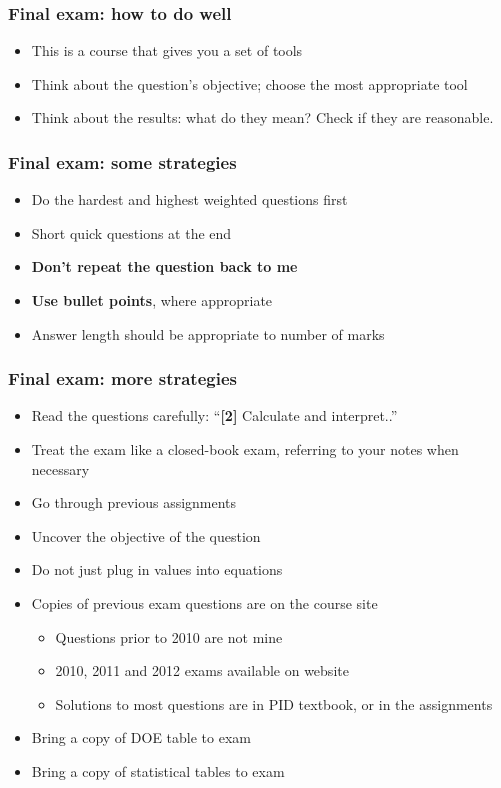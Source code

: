 \begin{frame}\frametitle{Final exam: how to do well}
	\begin{itemize}
		\item	This is a course that gives you a set of tools 
		\item	Think about the question's objective; choose the most appropriate tool 
		\item	Think about the results: what do they mean? Check if they are reasonable. 
	\end{itemize}
\end{frame}

\begin{frame}\frametitle{Final exam: some strategies}
	\begin{itemize}
		\item	Do the hardest and highest weighted questions first 
		\item	Short quick questions at the end 
		\item	\textbf{Don't repeat the question back to me} 
		\item	\textbf{Use bullet points}, where appropriate 
		\item	Answer length should be appropriate to number of marks 
	\end{itemize}
\end{frame}

\begin{frame}\frametitle{Final exam: more strategies}
	\begin{itemize}
		\item	Read the questions carefully: ``\textbf{[2]} Calculate and interpret..''
		\item	Treat the exam like a closed-book exam, referring to your notes when necessary 
		\item	Go through previous assignments 
		\item	Uncover the objective of the question
		\item	Do not just plug in values into equations 
		\item	Copies of previous exam questions are on the course site 
		\begin{itemize}
			\item	Questions prior to 2010 are not mine 
			\item	2010, 2011 and 2012 exams available on website 
			\item	Solutions to most questions are in PID textbook, or in the assignments
		\end{itemize}
	\end{itemize}
	\begin{itemize}
		\item	Bring a copy of DOE table to exam 
		\item	Bring a copy of statistical tables to exam 
	\end{itemize}
\end{frame}

